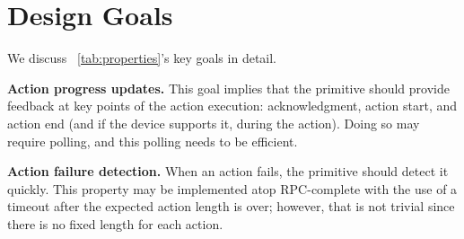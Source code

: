 \section{Design Goals}
\label{sec:properties}

We discuss \Table~\ref{tab:properties}'s key goals in detail. 

\noindent \textbf{Action progress updates.} 
This goal implies that 
the primitive should provide feedback at key points of the action execution: acknowledgment, action start, and action end (and if the device supports it, during the action). Doing so may require polling, and this polling needs to be efficient. 

\noindent \textbf{Action failure detection.} When an action fails, the primitive should detect it quickly.
This property may be implemented atop RPC-complete with the use of a timeout after the expected action length is over; however, that is not trivial since there is no fixed length for each action.


